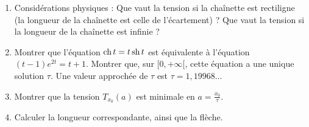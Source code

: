 \begin{frame}
\begin{exercicecours}
\begin{enumerate}
 \item Considérations physiques : Que vaut la tension si la chaînette est rectiligne (la longueur de la chaînette
est celle de l'écartement) ? Que vaut la tension si la longueur de la chaînette est infinie ?

 \item Montrer que l'équation $\mathop{\text{ch}}\nolimits t = t \mathop{\text{sh}}\nolimits t$ est équivalente à l'équation 
$(t-1)e^{2t}=t+1$. Montrer que, sur $[0,+\infty[$, cette équation a une unique solution $\tau$.
Une valeur approchée de $\tau$ est $\tau = 1,19968\ldots$


 \item Montrer que la tension $T_{x_0}(a)$ est minimale en $a= \frac{x_0}{\tau}$.


 \item Calculer la longueur correspondante, ainsi que la flèche.
\shorthandoff{:}
\shorthandon{:}

\end{enumerate}

\end{exercicecours}

\end{frame}



